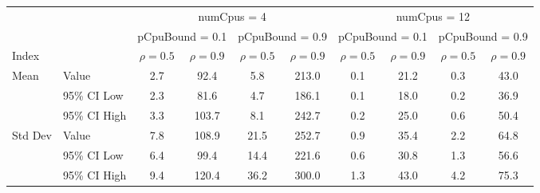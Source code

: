 \begin{tabular}{llc|c|c|c|c|c|c|c}
\toprule
& & \multicolumn{4}{c|}{numCpus = 4} & \multicolumn{4}{c}{numCpus = 12} \\
& & \multicolumn{2}{c|}{pCpuBound = 0.1} & \multicolumn{2}{c|}{pCpuBound = 0.9} & \multicolumn{2}{c|}{pCpuBound = 0.1} & \multicolumn{2}{c}{pCpuBound = 0.9} \\
Index & & $\rho = 0.5$ & $\rho = 0.9$ & $\rho = 0.5$ & $\rho = 0.9$ & $\rho = 0.5$ & $\rho = 0.9$ & $\rho = 0.5$ & $\rho = 0.9$ \\
\midrule
\multirow{3}{*}{Mean} & Value & 2.7 & 92.4 & 5.8 & 213.0 & 0.1 & 21.2 & 0.3 & 43.0 \\
 & 95\% CI Low & 2.3 & 81.6 & 4.7 & 186.1 & 0.1 & 18.0 & 0.2 & 36.9 \\
 & 95\% CI High & 3.3 & 103.7 & 8.1 & 242.7 & 0.2 & 25.0 & 0.6 & 50.4 \\
\midrule
\multirow{3}{*}{Std Dev} & Value & 7.8 & 108.9 & 21.5 & 252.7 & 0.9 & 35.4 & 2.2 & 64.8 \\
 & 95\% CI Low & 6.4 & 99.4 & 14.4 & 221.6 & 0.6 & 30.8 & 1.3 & 56.6 \\
 & 95\% CI High & 9.4 & 120.4 & 36.2 & 300.0 & 1.3 & 43.0 & 4.2 & 75.3 \\
\bottomrule
\end{tabular}
